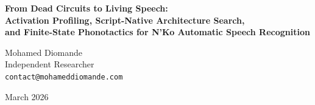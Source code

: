 \documentclass[11pt]{article}
\newcommand{\nko}{N'Ko}
\begin{document}
\begin{center}
{\LARGE\bfseries From Dead Circuits to Living Speech:\\[0.3em]
Activation Profiling, Script-Native Architecture Search,\\[0.3em]
and Finite-State Phonotactics for \nko{} Automatic Speech Recognition}

\vspace{1.5em}

{\large Mohamed Diomande}\\[0.3em]
{\normalsize Independent Researcher}\\[0.2em]
{\normalsize\texttt{contact@mohameddiomande.com}}

\vspace{1em}

{\normalsize March 2026}
\end{center}

\vspace{2em}
\end{document}
